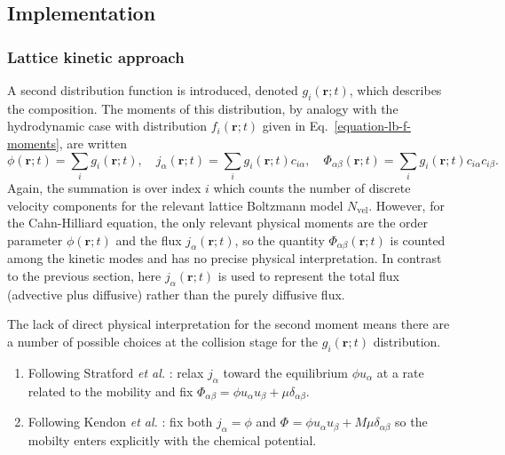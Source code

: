 \subsection{Implementation}

\subsubsection{Lattice kinetic approach}

A second distribution function is introduced, denoted $g_i(\mathbf{r};t)$,
which describes the composition. The moments of this distribution, by
analogy with the hydrodynamic case with distribution
$f_i(\mathbf{r};t)$ given in
Eq.~\ref{equation-lb-f-moments}, are written
\begin{equation}
\phi(\mathbf{r};t) = \sum_i g_i (\mathbf{r};t), \quad
j_\alpha(\mathbf{r};t) = \sum_i g_i(\mathbf{r};t) c_{i\alpha}, \quad
\Phi_{\alpha\beta}(\mathbf{r};t) = \sum_i g_i(\mathbf{r};t)
c_{i\alpha}c_{i\beta}.
\end{equation}
Again, the summation is over index $i$ which counts the number of
discrete velocity components for the relevant lattice Boltzmann
model $N_{\mathrm{vel}}$. However, for the Cahn-Hilliard equation,
the only relevant physical moments are the order parameter
$\phi(\mathbf{r};t)$ and the flux $j_\alpha(\mathbf{r};t)$, so
the quantity $\Phi_{\alpha\beta}(\mathbf{r};t)$ is counted among
the kinetic modes and has no precise physical interpretation. In
contrast to the previous section, here $j_\alpha(\mathbf{r};t)$
is used to represent the total flux (advective
plus diffusive) rather than the purely diffusive flux.

The lack of direct physical interpretation for the second moment
means there are a number of possible choices at the collision
stage for the $g_i(\mathbf{r};t)$ distribution.
\begin{enumerate}
\item
Following Stratford \textit{et al.} \cite{j-stat-phys-2005}:
relax $j_\alpha$ toward the equilibrium $\phi u_\alpha$
at a rate related to the mobility and fix $\Phi_{\alpha\beta} =
\phi u_\alpha u_\beta + \mu \delta_{\alpha\beta}$.
\item
Following Kendon \textit{et al.} \cite{kendon2001}: fix both
$j_\alpha = \phi$ and
$\Phi_{} = \phi u_\alpha u_\beta + M\mu \delta_{\alpha\beta}$ so the
mobilty enters explicitly with the chemical potential.
\end{enumerate}

